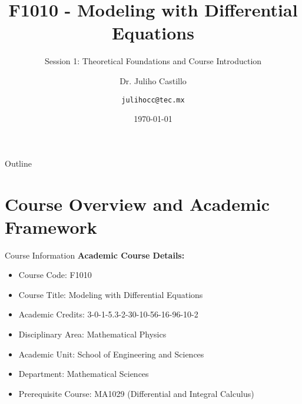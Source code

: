 \documentclass[10pt,aspectratio=169]{beamer}
\title{F1010 - Modeling with Differential Equations}
\subtitle{Session 1: Theoretical Foundations and Course Introduction}
\author{Dr. Juliho Castillo \and \texttt{julihocc@tec.mx}}
\institute{Tec de Monterrey}
\date{\today}
\newcommand{\concept}[1]{\textbf{#1}}
\begin{document}
\maketitle

\begin{frame}{Outline}
    \tableofcontents
\end{frame}

\section{Course Overview and Academic Framework}

\begin{frame}{Course Information}
    \concept{Academic Course Details:}
    \begin{itemize}
        \item Course Code: F1010
        \item Course Title: Modeling with Differential Equations
        \item Academic Credits: 3-0-1-5.3-2-30-10-56-16-96-10-2
        \item Disciplinary Area: Mathematical Physics
        \item Academic Unit: School of Engineering and Sciences
        \item Department: Mathematical Sciences
        \item Prerequisite Course: MA1029 (Differential and Integral Calculus)
    \end{itemize}
\end{frame}
\end{document}
